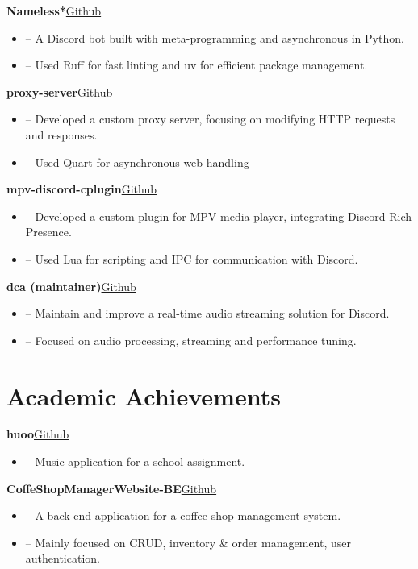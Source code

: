 \documentclass[a4paper,12pt]{article}
\newenvironment{itemList}[2]
    {
    \noindent\hspace{1em}\textbf{#1}\hfill#2\\[3.75pt]
    \begin{minipage}[t]{\linewidth}
    \begin{itemize}[nosep,after=\strut, leftmargin=2em, itemsep=3pt,label={}]
    }
    {
    \end{itemize}
    \end{minipage}    
    }
\begin{document}
\begin{itemList}{Nameless*}{\href{https://github.com/team-nameless/nameless-discord-bot/}{Github}}
    \item -- A Discord bot built with meta-programming and asynchronous in Python.
    \item -- Used Ruff for fast linting and uv for efficient package management.
\end{itemList}

\begin{itemList}{proxy-server}{\href{https://github.com/foxeiz/proxy-server/}{Github}}
    \item -- Developed a custom proxy server, focusing on modifying HTTP requests and responses.
    \item -- Used Quart for asynchronous web handling
\end{itemList}

\begin{itemList}{mpv-discord-cplugin}{\href{https://github.com/foxeiz/mpv-discord-cplugin/}{Github}}
    \item -- Developed a custom plugin for MPV media player, integrating Discord Rich Presence.
    \item -- Used Lua for scripting and IPC for communication with Discord.
\end{itemList}

\begin{itemList}{dca (maintainer)}{\href{https://github.com/foxeiz/dca/}{Github}}
    \item -- Maintain and improve a real-time audio streaming solution for Discord.
    \item -- Focused on audio processing, streaming and performance tuning.
\end{itemList}


\section{Academic Achievements}

\begin{itemList}{huoo}{\href{https://github.com/foxeiz/huoo/}{Github}}
    \item -- Music application for a school assignment.
\end{itemList}

\begin{itemList}{CoffeShopManagerWebsite-BE}{\href{https://github.com/foxeiz/CoffeShopManagerWebsite-BE/}{Github}}
    \item -- A back-end application for a coffee shop management system.
    \item -- Mainly focused on CRUD, inventory \& order management, user authentication.
\end{itemList}
\end{document}
